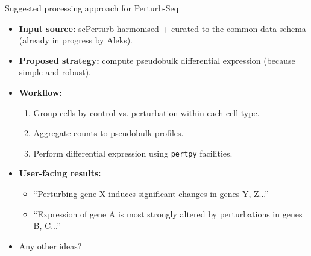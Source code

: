 \documentclass[handout]{beamer}
\begin{document}
\begin{frame}{Suggested processing approach for Perturb-Seq}
    \begin{itemize}
        \item \textbf{Input source:} scPerturb harmonised + curated to the common data schema (already in progress by Aleks).
        \item \textbf{Proposed strategy:} compute pseudobulk differential expression (because simple and robust).
        \item \textbf{Workflow:}
        \begin{enumerate}
            \item Group cells by control vs. perturbation within each cell type.
            \item Aggregate counts to pseudobulk profiles.
            \item Perform differential expression using \texttt{pertpy} facilities.
        \end{enumerate}
        \item \textbf{User-facing results:}
        \begin{itemize}
            \item ``Perturbing gene X induces significant changes in genes Y, Z...''
            \item ``Expression of gene A is most strongly altered by perturbations in genes B, C...''
        \end{itemize}
        \item Any other ideas?
    \end{itemize}
\end{frame}
\end{document}
